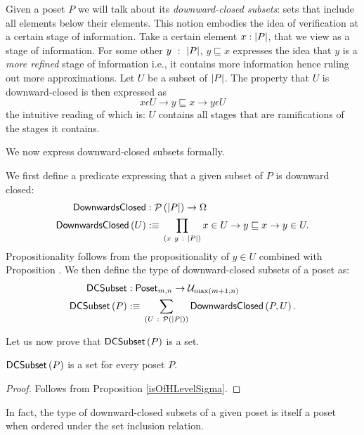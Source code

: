 Given a poset $P$ we will talk about its \emph{downward-closed subsets}: sets that include
all elements below their elements. This notion embodies the idea of verification at a
certain stage of information. Take a certain element $x : \left| P \right|$, that we view as a
stage of information. For some other $y~:~\left| P \right|$, $y \sqsubseteq x$ expresses the idea that $y$ is
a \emph{more refined} stage of information i.e., it contains more information hence ruling
out more approximations. Let $U$ be a subset of $\left| P \right|$. The property that $U$ is
downward-closed is then expressed as
\begin{equation*}
  x \epsilon U \rightarrow y \sqsubseteq x \rightarrow y \epsilon U
\end{equation*}
the intuitive reading of which is: $U$ contains all stages that are ramifications of the
stages it contains.

We now express downward-closed subsets formally.
\begin{defn}\label{defn:dc-subset}
  We first define a predicate expressing that a given subset of $P$ is downward closed:
  \begin{align*}
    \mathsf{DownwardsClosed}{} &:  \mathcal{P}\left(\left| P \right|\right) \rightarrow \Omega\\
    \mathsf{DownwardsClosed}{}\left(U\right)  &:\equiv{} \prod_{(x~y~:~\left| P \right|)} x \in U \rightarrow y \sqsubseteq x \rightarrow y \in U.
  \end{align*}
  Propositionality follows from the propositionality of $y \in U$ combined with
  Proposition \label{prop:pi-prop}. We then define the type of downward-closed subsets of
  a poset as:
  \begin{align*}
    \mathsf{DCSubset}{} &: \mathsf{Poset}_{m, n} \rightarrow \mathcal{U}_{\max(m+1, n)}\\
    \mathsf{DCSubset}{}\left(P\right)  &:\equiv{} \sum_{(U~:~\mathcal{P}\left(\left| P \right|\right))} \mathsf{DownwardsClosed}{}\left(P, U\right).
  \end{align*}
\end{defn}

Let us now prove that $\mathsf{DCSubset}{}\left(P\right)$ is a set.
\begin{prop}\label{isSetDCSubset}
  $\mathsf{DCSubset}{}\left(P\right)$ is a set for every poset $P$.
\end{prop}
\begin{proof}
  Follows from Proposition \ref{isOfHLevelSigma}.
\end{proof}

In fact, the type of downward-closed subsets of a given poset is itself a poset
when ordered under the set inclusion relation.

